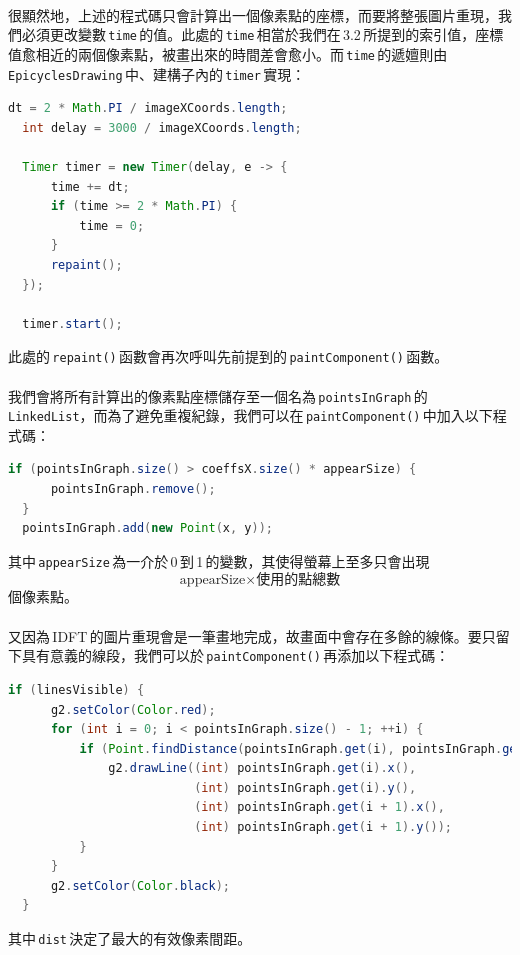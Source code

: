   \noindent \\
  很顯然地，上述的程式碼只會計算出一個像素點的座標，而要將整張圖片重現，我們必須更改變數\,\texttt{time}\,的值。此處的\,\texttt{time}\,相當於我們在\,3.2\,所提到的索引值，座標值愈相近的兩個像素點，被畫出來的時間差會愈小。而\,\texttt{time}\,的遞嬗則由\,\texttt{EpicyclesDrawing}\,中、建構子內的\,\texttt{timer}\,實現：
  \begin{lstlisting}[language=Java]
  dt = 2 * Math.PI / imageXCoords.length;
  int delay = 3000 / imageXCoords.length;
  
  Timer timer = new Timer(delay, e -> {
      time += dt;
      if (time >= 2 * Math.PI) {
          time = 0;
      }
      repaint();
  });
  
  timer.start();
  \end{lstlisting}
  \noindent 此處的\,\texttt{repaint()}\,函數會再次呼叫先前提到的\,\texttt{paintComponent()}\,函數。
  \\\\
  我們會將所有計算出的像素點座標儲存至一個名為\,\texttt{pointsInGraph}\,的\,\texttt{LinkedList}，而為了避免重複紀錄，我們可以在\,\texttt{paintComponent()}\,中加入以下程式碼：
  \begin{lstlisting}[language=Java]
  if (pointsInGraph.size() > coeffsX.size() * appearSize) {
      pointsInGraph.remove();
  }
  pointsInGraph.add(new Point(x, y));
  \end{lstlisting}
  \noindent 其中\,\texttt{appearSize}\,為一介於\,0\,到\,1\,的變數，其使得螢幕上至多只會出現
  \[\text{appearSize}\times\text{使用的點總數}\]
  個像素點。
  \\\\
  又因為\,IDFT\,的圖片重現會是一筆畫地完成，故畫面中會存在多餘的線條。要只留下具有意義的線段，我們可以於\,\texttt{paintComponent()}\,再添加以下程式碼：
  \begin{lstlisting}[language=Java]
  if (linesVisible) {
      g2.setColor(Color.red);
      for (int i = 0; i < pointsInGraph.size() - 1; ++i) {
          if (Point.findDistance(pointsInGraph.get(i), pointsInGraph.get(i + 1)) < dist) {
              g2.drawLine((int) pointsInGraph.get(i).x(),
                          (int) pointsInGraph.get(i).y(),
                          (int) pointsInGraph.get(i + 1).x(),
                          (int) pointsInGraph.get(i + 1).y());
          }
      }
      g2.setColor(Color.black);
  }
  \end{lstlisting}
  \noindent 其中\,\texttt{dist}\,決定了最大的有效像素間距。
  \\\\
